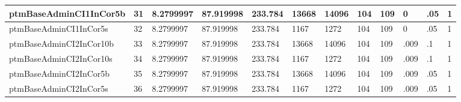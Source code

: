\begin{table}[htbp]
\begin{tabular}{|l|l|l|l|l|l|l|l|l|l|l|l|}
ptmBaseAdminCI1InCor5b & 31 & 8.2799997 & 87.919998 & 233.784 & 13668 & 14096 & 104 & 109 & 0 & .05 & 1 \\ \hline 
ptmBaseAdminCI1InCor5s & 32 & 8.2799997 & 87.919998 & 233.784 & 1167 & 1272 & 104 & 109 & 0 & .05 & 1 \\ \hline 
ptmBaseAdminCI2InCor10b & 33 & 8.2799997 & 87.919998 & 233.784 & 13668 & 14096 & 104 & 109 & .009 & .1 & 1 \\ \hline 
ptmBaseAdminCI2InCor10s & 34 & 8.2799997 & 87.919998 & 233.784 & 1167 & 1272 & 104 & 109 & .009 & .1 & 1 \\ \hline 
ptmBaseAdminCI2InCor5b & 35 & 8.2799997 & 87.919998 & 233.784 & 13668 & 14096 & 104 & 109 & .009 & .05 & 1 \\ \hline 
ptmBaseAdminCI2InCor5s & 36 & 8.2799997 & 87.919998 & 233.784 & 1167 & 1272 & 104 & 109 & .009 & .05 & 1 \\ \hline 
  \end{tabular}
\end{table}
